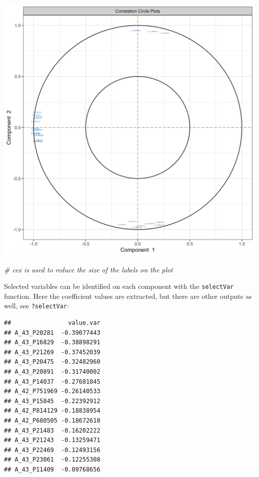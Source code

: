 \documentclass[]{book}
\newenvironment{Shaded}{\begin{snugshade}}{\end{snugshade}}
\newcommand{\CommentTok}[1]{\textcolor[rgb]{0.56,0.35,0.01}{\textit{#1}}}
\newcommand{\DataTypeTok}[1]{\textcolor[rgb]{0.13,0.29,0.53}{#1}}
\newcommand{\DecValTok}[1]{\textcolor[rgb]{0.00,0.00,0.81}{#1}}
\newcommand{\KeywordTok}[1]{\textcolor[rgb]{0.13,0.29,0.53}{\textbf{#1}}}
\newcommand{\NormalTok}[1]{#1}
\newcommand{\OperatorTok}[1]{\textcolor[rgb]{0.81,0.36,0.00}{\textbf{#1}}}
\begin{document}
\begin{center}\includegraphics[width=0.75\linewidth,]{Figures/03-pca-liver-plotIndiv-args-2} \end{center}

\begin{Shaded}
\begin{Highlighting}[]
\CommentTok{# cex is used to reduce the size of the labels on the plot}
\end{Highlighting}
\end{Shaded}

Selected variables can be identified on each component with the \texttt{selectVar} function. Here the coefficient values are extracted, but there are other outputs as well, see \texttt{?selectVar}:

\begin{Shaded}
\end{Shaded}

\begin{verbatim}
##                value.var
## A_43_P20281  -0.39077443
## A_43_P16829  -0.38898291
## A_43_P21269  -0.37452039
## A_43_P20475  -0.32482960
## A_43_P20891  -0.31740002
## A_43_P14037  -0.27681845
## A_42_P751969 -0.26140533
## A_43_P15845  -0.22392912
## A_42_P814129 -0.18838954
## A_42_P680505 -0.18672610
## A_43_P21483  -0.16202222
## A_43_P21243  -0.13259471
## A_43_P22469  -0.12493156
## A_43_P23061  -0.12255308
## A_43_P11409  -0.09768656
\end{verbatim}
\end{document}
